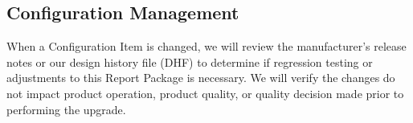 \subsection{Configuration Management}
When a Configuration Item is changed, we will review the manufacturer's release
notes or our design history file (DHF) to determine if regression testing or
adjustments to this Report Package is necessary. We will verify the changes do
not impact product operation, product quality, or quality decision made prior
to performing the upgrade.
